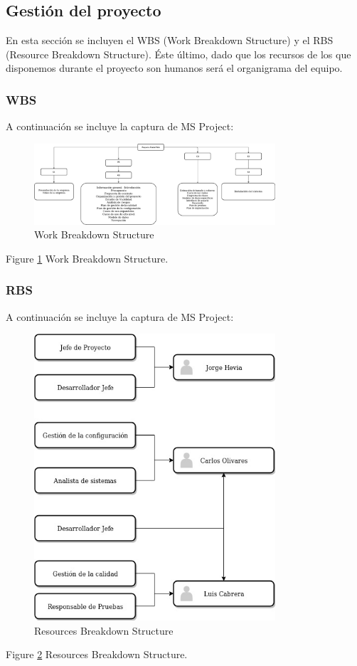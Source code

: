 \subsection{Gestión del proyecto}
\par En esta sección se incluyen el WBS (Work Breakdown Structure) y el RBS (Resource Breakdown Structure). Éste último, dado que los recursos de los que disponemos durante el proyecto son humanos será el organigrama del equipo.

\subsubsection{WBS}
\par A continuación se incluye la captura de MS Project:
\begin{figure}
  \centering
    \includegraphics[width=0.8\textwidth]{img/WBS.jpeg}
  \caption{Work Breakdown Structure}
  \label{fig:wbs}
\end{figure}
Figure \ref{fig:wbs} Work Breakdown Structure.


\subsubsection{RBS}
\par A continuación se incluye la captura de MS Project:
\begin{figure}
  \centering
    \includegraphics[width=0.8\textwidth]{img/RBS.jpeg}
  \caption{Resources Breakdown Structure}
  \label{fig:rbs}
\end{figure}
Figure \ref{fig:rbs} Resources Breakdown Structure.